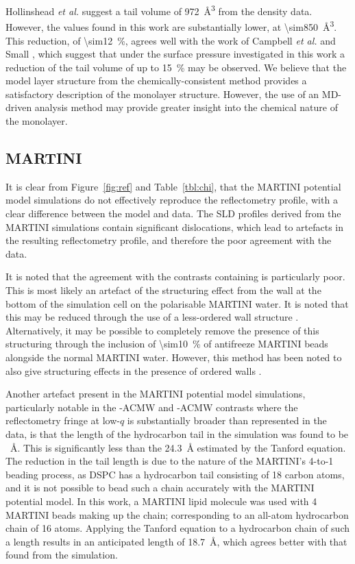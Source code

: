 \documentclass[amsmath,amssymb,twocolumn,superscriptaddress]{revtex4-1}
\begin{document}
Hollinshead \emph{et al.} \cite{hollinshead_effects_2009} suggest a tail volume of \SI{972}{\angstrom\cubed} from the density data.
However, the values found in this work are substantially lower, at \SI{\sim850}{\angstrom\cubed}.
This reduction, of \SI{\sim12}{\percent}, agrees well with the work of Campbell \emph{et al.} \cite{campbell_structure_2018} and Small \cite{small_lateral_1984}, which suggest that under the surface pressure investigated in this work a reduction of the tail volume of up to \SI{15}{\percent} may be observed.
We believe that the model layer structure from the chemically-consistent method provides a satisfactory description of the monolayer structure.
However, the use of an MD-driven analysis method may provide greater insight into the chemical nature of the monolayer.

\subsection{MARTINI}
It is clear from Figure~\ref{fig:ref} and Table~\ref{tbl:chi}, that the MARTINI potential model simulations do not effectively reproduce the reflectometry profile, with a clear difference between the model and data.
The SLD profiles derived from the MARTINI simulations contain significant dislocations, which lead to artefacts in the resulting reflectometry profile, and therefore the poor agreement with the data.

It is noted that the agreement with the contrasts containing  is particularly poor.
This is most likely an artefact of the structuring effect from the wall at the bottom of the simulation cell on the polarisable MARTINI water.
It is noted that this may be reduced through the use of a less-ordered wall structure \cite{koutsioubas_combined_2016}.
Alternatively, it may be possible to completely remove the presence of this structuring through the inclusion of \SI{\sim10}{\percent} of antifreeze MARTINI beads alongside the normal MARTINI water.
However, this method has been noted to also give structuring effects in the presence of ordered walls \cite{marrink_comment_2010}.

Another artefact present in the MARTINI potential model simulations, particularly notable in the -ACMW and -ACMW contrasts where the reflectometry fringe at low-$q$ is substantially broader than represented in the data, is that the length of the hydrocarbon tail in the simulation was found to be ~\si{\angstrom}.
This is significantly less than the \SI{24.3}{\angstrom} estimated by the Tanford equation.
The reduction in the tail length is due to the nature of the MARTINI's 4-to-1 beading process, as DSPC has a hydrocarbon tail consisting of 18 carbon atoms, and it is not possible to bead such a chain accurately with the MARTINI potential model.
In this work, a MARTINI lipid molecule was used with 4 MARTINI beads making up the chain; corresponding to an all-atom hydrocarbon chain of 16 atoms.
Applying the Tanford equation to a hydrocarbon chain of such a length results in an anticipated length of \SI{18.7}{\angstrom}, which agrees better with that found from the simulation.
\end{document}
